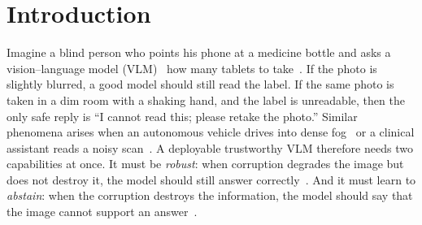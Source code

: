 \section{Introduction}
\label{sec:intro}

Imagine a blind person who points his phone at a medicine bottle and asks a vision--language
model (VLM)~\cite{liu2023llava,qwen3vl2025,wang2025internvl35,
gemmateam2025gemma3technicalreport} how many tablets to take~\cite{bigham2010vizwiz,
gurari2018vizwiz}. If the photo is slightly blurred, a good model should still read the label. If the same photo is taken in a dim room with a shaking hand, and the label is unreadable, then the only safe reply is ``I cannot read this; please retake the photo.'' Similar phenomena arises when an autonomous vehicle drives into dense fog~\cite{michaelis2019winter,sima2024drivelm} or a clinical assistant reads a noisy scan~\cite{li2023llavamed}. A deployable trustworthy VLM therefore needs two capabilities at once. It must be \emph{robust}: when corruption degrades the image but does not destroy it, the model should still answer correctly~\cite{dodge2016quality,geirhos2018generalisation,hendrycks2019imagenetc,
hendrycks2021manyfaces,qiu2024mmrobustness,usama2025analysing}. And it must learn to 
\emph{abstain}: when the corruption destroys the information, the model should say that the
image cannot support an answer~\cite{chow1970optimum,elyaniv2010selective,
geifman2017selective,whitehead2022reliable,miyai2024upd,wen2025abstention}.

